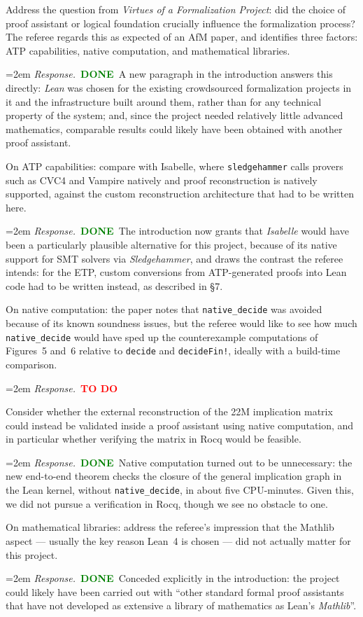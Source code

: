 \documentclass[11pt]{amsart}
\newcommand{\todo}{\textcolor{red}{\textbf{TO DO}}}
\newcommand{\done}{\textcolor{green}{\textbf{DONE}}}
\newcommand{\response}[1]{%
  \par\smallskip
  \noindent\hangindent=2em\hangafter=1
  \textit{Response.}\ #1
  \par\smallskip}
\begin{document}
\begin{requests}[resume]

\item Address the question from \emph{Virtues of a Formalization Project}: did the
choice of proof assistant or logical foundation crucially influence the formalization
process? The referee regards this as expected of an AfM paper, and identifies three
factors: ATP capabilities, native computation, and mathematical libraries.
\response{\done\ A new paragraph in the introduction answers this directly: \emph{Lean} was
chosen for the existing crowdsourced formalization projects in it and the infrastructure
built around them, rather than for any technical property of the system; and, since the
project needed relatively little advanced mathematics, comparable results could likely
have been obtained with another proof assistant.}

\item On ATP capabilities: compare with Isabelle, where \texttt{sledgehammer} calls
provers such as CVC4 and Vampire natively and proof reconstruction is natively
supported, against the custom reconstruction architecture that had to be written here.
\response{\done\ The introduction now grants that \emph{Isabelle} would have been a
particularly plausible alternative for this project, because of its native support for SMT
solvers via \emph{Sledgehammer}, and draws the contrast the referee intends: for the ETP,
custom conversions from ATP-generated proofs into Lean code had to be written instead, as
described in \S7.}

\item On native computation: the paper notes that \texttt{native\_decide} was avoided
because of its known soundness issues, but the referee would like to see how much
\texttt{native\_decide} would have sped up the counterexample computations of
Figures~5 and~6 relative to \texttt{decide} and \texttt{decideFin!}, ideally with a
build-time comparison.
\response{\todo}

\item Consider whether the external reconstruction of the 22M implication matrix could
instead be validated inside a proof assistant using native computation, and in
particular whether verifying the matrix in Rocq would be feasible.
\response{\done\ Native computation turned out to be unnecessary: the new end-to-end theorem checks the closure of the general implication graph in the Lean kernel, without \texttt{native\_decide}, in about five CPU-minutes. Given this, we did not pursue a verification in Rocq, though we see no obstacle to one.}

\item On mathematical libraries: address the referee's impression that the Mathlib
aspect --- usually the key reason Lean~4 is chosen --- did not actually matter for
this project.
\response{\done\ Conceded explicitly in the introduction: the project could likely have been
carried out with ``other standard formal proof assistants that have not developed as
extensive a library of mathematics as Lean's \emph{Mathlib}''.}

\end{requests}
\end{document}
